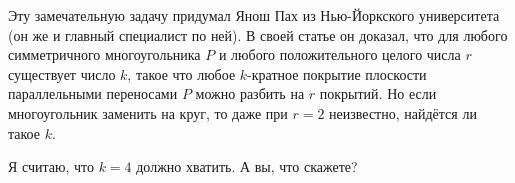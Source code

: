 \medskip

Эту замечательную задачу придумал Янош Пах из Нью-Йоркского университета (он же и главный специалист по ней).
В своей статье \cite{46} он доказал, что для любого симметричного многоугольника $P$ и любого положительного целого числа $r$ существует число $k$, такое что любое $k$-кратное покрытие плоскости параллельными переносами $P$ можно разбить на $r$ покрытий.
Но если многоугольник заменить на круг, то даже при $r = 2$ неизвестно, найдётся ли такое $k$.

Я считаю, что $k = 4$ должно хватить.
А вы, что скажете?

